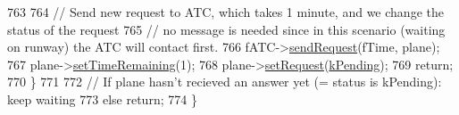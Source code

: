 \begin{DoxyCode}
763 
764         \textcolor{comment}{// Send new request to ATC, which takes 1 minute, and we change the status of the request}
765         \textcolor{comment}{// no message is needed since in this scenario (waiting on runway) the ATC will contact first.}
766         fATC->\hyperlink{classATC_aaabbddfb988289b786b18ba8f50510f2}{sendRequest}(fTime, plane);
767         plane->\hyperlink{classAirplane_a43e7b856df001168956ed6d115943ec9}{setTimeRemaining}(1);
768         plane->\hyperlink{classAirplane_affcc5325670824881ccc1524223aa209}{setRequest}(\hyperlink{Airplane_8h_a4a8a3f45932bdf601f093bea061bad9bad143035084d581f7aecfabd95652e62c}{kPending});
769         \textcolor{keywordflow}{return};
770     \}
771 
772     \textcolor{comment}{// If plane hasn't recieved an answer yet (= status is kPending): keep waiting}
773     \textcolor{keywordflow}{else} \textcolor{keywordflow}{return};
774 \}
\end{DoxyCode}
